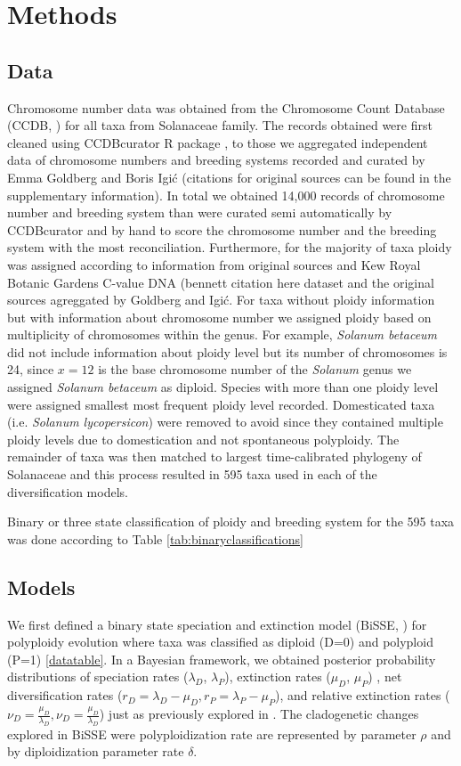 \section{Methods}
\subsection{Data}
Chromosome number data was obtained from the Chromosome Count Database (CCDB, \citet{rice_2015}) for all taxa from Solanaceae family. The records obtained were first cleaned using CCDBcurator R package \citep{zenilferguson_2017}, to those we aggregated independent data of chromosome numbers and breeding systems recorded and curated by Emma Goldberg and Boris Igi\'c  (citations for original sources can be found in the supplementary information). In total we obtained 14,000 records of chromosome number and breeding system than were curated semi automatically by CCDBcurator and by hand to score the chromosome number and the breeding system with the most reconciliation. Furthermore, for the majority of taxa ploidy was assigned according to information from original sources and Kew Royal Botanic Gardens C-value DNA (bennett citation here dataset and the original sources agreggated by Goldberg and Igi\'c. For taxa without ploidy information but with information about chromosome number we assigned ploidy based on multiplicity of chromosomes within the genus. For example, \textit{Solanum betaceum} did not include information about ploidy level but its number of chromosomes is 24, since $x=12$ is the base chromosome number of the \textit{Solanum} genus we assigned  \textit{Solanum betaceum} as diploid. Species with more than one ploidy level were assigned smallest most frequent ploidy level recorded. Domesticated taxa (i.e. \textit{Solanum lycopersicon}) were removed to avoid since they contained multiple ploidy levels due to domestication and not spontaneous polyploidy. The remainder of taxa was then matched to largest time-calibrated  phylogeny of Solanaceae and this process resulted in 595 taxa used in each of the diversification models.

Binary or three state classification of ploidy and breeding system for the 595 taxa  was done according to Table \autoref{tab:binaryclassifications}
  
\subsection{Models}
We first defined a binary state speciation and extinction model (BiSSE, \citet{maddison_2007})  for polyploidy evolution where taxa was classified as diploid (D=0) and polyploid (P=1) \ref{datatable}. In  a Bayesian framework, we obtained posterior probability distributions of speciation rates ($\lambda_D$, $\lambda_P$), extinction rates ($\mu_D$, $\mu_P$) , net diversification rates ($r_D=\lambda_D-\mu_D, r_P=\lambda_P-\mu_P$), and  relative extinction rates ($\nu_D=\frac{\mu_D}{\lambda_D}, \nu_D=\frac{\mu_D}{\lambda_D}$) just as previously explored in \citet{mayrose_2011}. The cladogenetic changes explored in BiSSE were polyploidization rate are represented by parameter $\rho$ and by diploidization parameter rate $\delta$.\newline 

